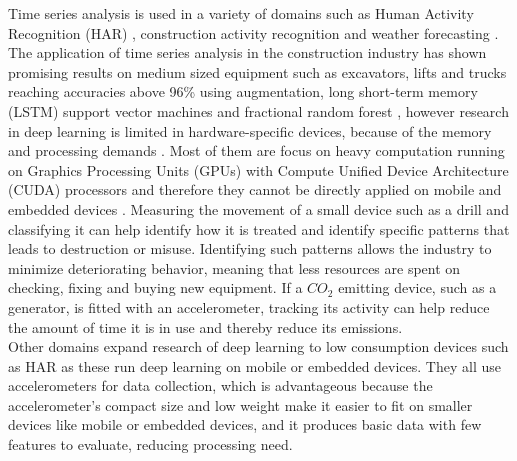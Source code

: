 Time series analysis is used in a variety of domains such as Human Activity Recognition (HAR) \cite{HumanActivityrecognitionAccelerometer}, construction activity recognition \cite{ConstructionRecognitionFractionalRandomForest}\cite{timeseriesDataAugmentationConstruction} and weather forecasting \cite{weatherForecastTimeSeries}.
The application of time series analysis in the construction industry has shown promising results on medium sized equipment such as excavators, lifts and trucks reaching accuracies above 96\% \cite{timeseriesDataAugmentationConstruction, constructionRecognitionMobileSensors,ConstructionRecognitionFractionalRandomForest} using augmentation, long short-term memory (LSTM) \cite{timeseriesDataAugmentationConstruction} support vector machines \cite{constructionRecognitionMobileSensors} and fractional random forest \cite{ConstructionRecognitionFractionalRandomForest}, however research in deep learning is limited in hardware-specific devices, because of the memory and processing demands \cite{deepLearningLowConsumptionStateOfTheArt}. Most of them are focus on heavy computation running on Graphics Processing Units (GPUs) with Compute Unified Device Architecture (CUDA) processors and therefore they cannot be directly applied on mobile and embedded devices \cite{deepLearningLowConsumptionStateOfTheArt}.
Measuring the movement of a small device such as a drill and classifying it can help identify how it is treated and identify specific patterns that leads to destruction or misuse. Identifying such patterns allows the industry to minimize deteriorating behavior, meaning that less resources are spent on checking, fixing and buying new equipment. If a $CO_2$ emitting device, such as a generator, is fitted with an accelerometer, tracking its activity can help reduce the amount of time it is in use and thereby reduce its emissions.\\ 
Other domains expand research of deep learning to low consumption devices such as HAR \cite{HumanActivityrecognitionAccelerometer, HARsignalprocessing, hybridHARSVMCNN} as these run deep learning on mobile or embedded devices. They all use accelerometers for data collection, which is advantageous because the accelerometer's compact size and low weight make it easier to fit on smaller devices like mobile or embedded devices, and it produces basic data with few features to evaluate, reducing processing need.
